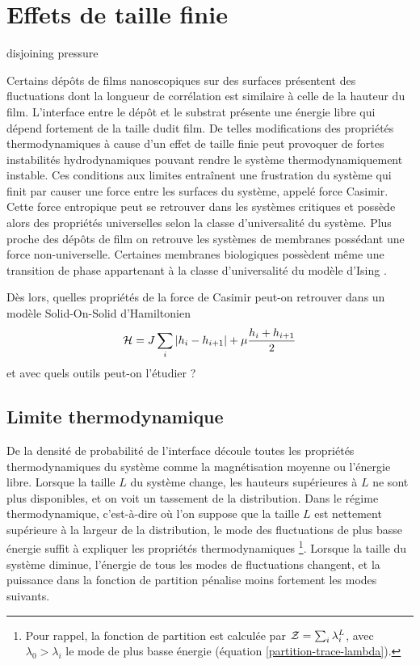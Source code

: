 \chapter{Effets de taille finie}
    \label{chap-sos}

disjoining pressure
\cite{bergeron_forces_1999}
\cite{stubenrauch_disjoining_2003}



Certains dépôts de films nanoscopiques sur des surfaces présentent des fluctuations dont la longueur de corrélation est similaire à celle de la hauteur du film. L'interface entre le dépôt et le substrat présente une énergie libre qui dépend fortement de la taille dudit film\cite{ouyang_size-dependent_2006,jiang_size_2008}. De telles modifications des propriétés thermodynamiques à cause d'un effet de taille finie peut provoquer de fortes instabilités hydrodynamiques pouvant rendre le système thermodynamiquement instable\cite{ding_theoretical_2001}. Ces conditions aux limites entraînent une frustration du système qui finit par causer une force entre les surfaces du système, appelé force Casimir. Cette force entropique peut se retrouver dans les systèmes critiques et possède alors des propriétés universelles selon la classe d'universalité du système. Plus proche des dépôts de film on retrouve les systèmes de membranes\cite{nelson_statistical_2004} possédant une force non-universelle\cite{hasnaoui_casimir_2010}. Certaines membranes biologiques possèdent même une transition de phase appartenant à la classe d'universalité du modèle d'Ising \cite{machta_critical_2012}.

Dès lors, quelles propriétés de la force de Casimir peut-on retrouver dans un modèle Solid-On-Solid d'Hamiltonien
\begin{align}
    \mathcal{H} = J \sum_i |h_i-h_{i+1}| + \mu \frac{h_i+h_{i+1}}{2}
\end{align}
et avec quels outils peut-on l'étudier ?

\section{Limite thermodynamique}

De la densité de probabilité de l'interface découle toutes les propriétés thermodynamiques du système comme la magnétisation moyenne ou l'énergie libre. Lorsque la taille $L$ du système change, les hauteurs supérieures à $L$ ne sont plus disponibles, et on voit un tassement de la distribution. Dans le régime thermodynamique, c'est-à-dire où l'on suppose que la taille $L$ est nettement supérieure à la largeur de la distribution, le mode des fluctuations de plus basse énergie suffit à expliquer les propriétés thermodynamiques \footnote{Pour rappel, la fonction de partition est calculée par $\mathcal{Z} = \sum_i \lambda_i^L$, avec $\lambda_0 \greater \lambda_i$ le mode de plus basse énergie (équation \ref{partition-trace-lambda}).}. Lorsque la taille du système diminue, l'énergie de tous les modes de fluctuations changent, et la puissance dans la fonction de partition pénalise moins fortement les modes suivants. 

